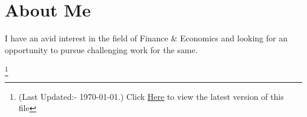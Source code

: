 \documentclass[12pt,a4paper,sans]{moderncv}
\newcommand{\Myinput}[2]{\vspace{#1}{}}
\begin{document}
 	\makecvtitle
 	\vspace{-30pt} %
 	\section{\hspace{10em} About Me}{I have an avid interest in the field of Finance \& Economics and looking for an opportunity to pursue challenging work for the same.}	 %
	
	\Myinput{-10pt}{education-content.tex}        	%
	
	\Myinput{-10pt}{experience-content.tex}        	%

	\Myinput{-10pt}{courses-content.tex}			%
	
	\Myinput{-10pt}{responsibilities-content.tex}	%
	
	\pagebreak
	 
	\Myinput{-10pt}{skill-content.tex}				%
	
	\Myinput{-10pt}{project-content.tex}			%
	
	\Myinput{-10pt}{social-content.tex}				%
	 
 	\let\thefootnote\relax\footnote{(Last Updated:- \today.) Click \href{https://docs.google.com/gview?url=https://raw.githubusercontent.com/Vallabh-Desai/Resume/edel/src/pdf/resume.pdf&embedded=true}{Here} to view the latest version of this file}
	 
 
\end{document}
